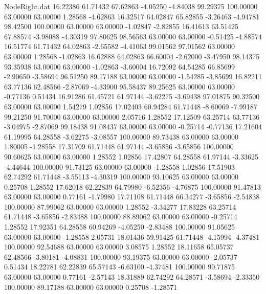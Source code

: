 \begin{filecontents}{NodeRight.dat}
  16.22386   61.71432   67.62863    -4.05250   -4.84038   99.29375  100.00000   63.00000   63.00000    1.28568   -4.62863
  16.32517   64.02847   65.82855    -3.26463   -4.94781   98.42500  100.00000   63.00000   63.00000   -1.02847   -2.82855
  16.41613   63.51425   67.88574    -3.98088   -4.30319   97.80625   98.56563   63.00000   63.00000   -0.51425   -4.88574
  16.51774   61.71432   64.02863    -2.65582   -4.41063   99.01562   97.01562   63.00000   63.00000    1.28568   -1.02863
  16.62888   64.02863   66.60004    -2.62000   -3.47950   98.14375   93.35938   63.00000   63.00000   -1.02863   -3.60004
  16.72092   64.54285   66.85699    -2.90650   -3.58694   96.51250   89.17188   63.00000   63.00000   -1.54285   -3.85699
  16.82211   63.77136   62.48566    -2.87069   -4.33900   95.58437   89.25625   63.00000   63.00000   -0.77136    0.51434
  16.91286   61.45721   61.97144    -3.62275   -3.69438   97.01875   90.32500   63.00000   63.00000    1.54279    1.02856
  17.02403   60.94284   61.71448    -8.60069   -7.99187   99.21250   91.70000   63.00000   63.00000    2.05716    1.28552
  17.12509   63.25714   63.77136    -3.04975   -2.87069   99.18438   91.08437   63.00000   63.00000   -0.25714   -0.77136
  17.21604   61.19995   64.28558    -3.62275   -3.08557  100.00000   89.73438   63.00000   63.00000    1.80005   -1.28558
  17.31709   61.71448   61.97144    -3.65856   -3.65856  100.00000   90.60625   63.00000   63.00000    1.28552    1.02856
  17.42807   64.28558   61.97144    -3.33625   -4.44644  100.00000   91.73125   63.00000   63.00000   -1.28558    1.02856
  17.51903   62.74292   61.71448    -3.55113   -4.30319  100.00000   93.10625   63.00000   63.00000    0.25708    1.28552
  17.62018   62.22839   64.79980    -6.52356   -4.76875  100.00000   91.47813   63.00000   63.00000    0.77161   -1.79980
  17.71108   61.71448   66.34277    -3.65856   -2.54838  100.00000   87.99062   63.00000   63.00000    1.28552   -3.34277
  17.83228   63.25714   61.71448    -3.65856   -2.83488  100.00000   88.89062   63.00000   63.00000   -0.25714    1.28552
  17.92351   64.28558   60.94269    -4.05250   -2.83488  100.00000   91.05625   63.00000   63.00000   -1.28558    2.05731
  18.01436   59.91425   61.71448    -4.15994   -4.37481  100.00000   92.54688   63.00000   63.00000    3.08575    1.28552
  18.11658   65.05737   62.48566    -3.80181   -4.08831  100.00000   93.19375   63.00000   63.00000   -2.05737    0.51434
  18.22781   62.22839   65.57143    -6.63100   -4.37481  100.00000   90.71875   63.00000   63.00000    0.77161   -2.57143
  18.31889   62.74292   64.28571    -3.58694   -2.33350  100.00000   89.17188   63.00000   63.00000    0.25708   -1.28571

\end{filecontents}
